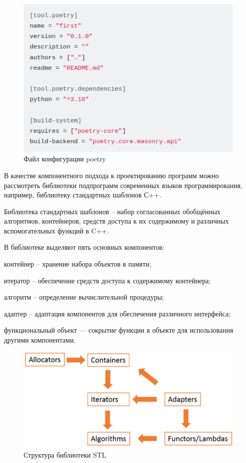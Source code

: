 \begin{figure}[H]
	\includegraphics[scale=0.7]{author/part5/figures/poetry.png}
	\caption{Файл конфигурации poetry}
	\label{fig:poetry}
\end{figure}

В качестве компонентного подхода к проектированию программ можно рассмотреть библиотеки подпрограмм современных языков программирования, например, библиотеку стандартных шаблонов С++.

Библиотека стандартных шаблонов -- набор согласованных обобщённых алгоритмов, контейнеров, средств доступа к их содержимому и различных вспомогательных функций в C++.

В библиотеке выделяют пять основных компонентов:
\begin{textitemize}
	\item контейнер -- хранение набора объектов в памяти;
	\item итератор -- обеспечение средств доступа к содержимому контейнера;
	\item алгоритм -- определение вычислительной процедуры;
	\item адаптер -- адаптация компонентов для обеспечения различного интерфейса;
	\item функциональный объект — сокрытие функции в объекте для использования другими компонентами.
\end{textitemize}

\begin{figure}[H]
	\includegraphics[scale=0.7]{author/part5/figures/STL.png}
	\caption{Структура библиотеки STL}
	\label{fig:STL}
\end{figure}

